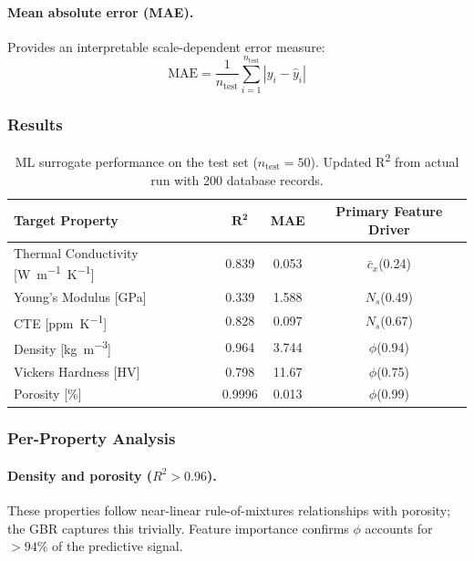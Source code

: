 \documentclass[11pt,a4paper]{article}
\begin{document}
\paragraph{Mean absolute error (MAE).}
Provides an interpretable scale-dependent error measure:
\begin{equation}
    \text{MAE} = \frac{1}{n_{\text{test}}} \sum_{i=1}^{n_{\text{test}}} |y_i - \hat{y}_i|
\end{equation}

\subsubsection{Results}

\begin{table}[htbp]
\centering
\caption{ML surrogate performance on the test set ($n_{\text{test}} = 50$). Updated R\textsuperscript{2} from actual run with 200 database records.}
\label{tab:ml_results}
\begin{tabular}{@{}lccc@{}}
\toprule
\textbf{Target Property} & $\bm{R^2}$ & \textbf{MAE} & \textbf{Primary Feature Driver} \\
\midrule
Thermal Conductivity [\si{W.m^{-1}.K^{-1}}] & 0.839 & 0.053 & $\bar{c}_x$\;(0.24) \\
Young's Modulus [\si{GPa}]                    & 0.339 & 1.588 & $N_s$\;(0.49) \\
CTE [\si{ppm.K^{-1}}]                         & 0.828 & 0.097 & $N_s$\;(0.67) \\
Density [\si{kg.m^{-3}}]                       & 0.964 & 3.744 & $\phi$\;(0.94) \\
Vickers Hardness [HV]                          & 0.798 & 11.67 & $\phi$\;(0.75) \\
Porosity [\%]                                  & 0.9996 & 0.013 & $\phi$\;(0.99) \\
\bottomrule
\end{tabular}
\end{table}

\subsubsection{Per-Property Analysis}

\paragraph{Density and porosity ($R^2 > 0.96$).}
These properties follow near-linear rule-of-mixtures relationships with porosity; the GBR captures this trivially. Feature importance confirms $\phi$ accounts for $> 94\%$ of the predictive signal.
\end{document}
